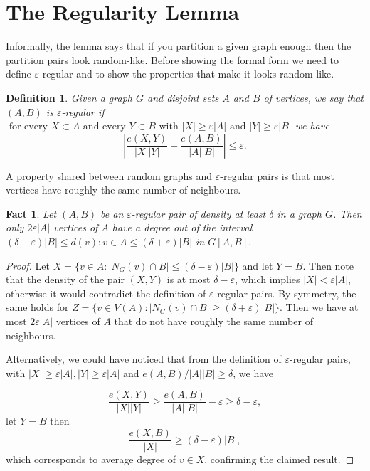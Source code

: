 \documentclass[12pt,twoside,a4paper,bibliography=totocnumbered]{book}
\numberwithin{equation}{section}
\newtheorem{definition}	[theorem] {Definition}
\newtheorem{fact}	[theorem] {Fact}
\theoremstyle{remark}
\begin{document}
\section{The Regularity Lemma}

Informally, the lemma says that if you partition a given graph enough then the partition pairs look random-like. Before showing the formal form we need to define $\varepsilon$-regular and to show the properties that make it looks random-like.

\begin{definition}
Given a graph $G$ and disjoint sets $A$ and $B$ of vertices, we say that $(A,B)$ is $\varepsilon$-regular if $\text{ for every } X \subset A \text{ and every } Y \subset B\text{ with } |X| \geq \varepsilon|A| \text{ and } |Y| \geq \varepsilon |B|$ we have
$$ \left| \frac{e(X,Y)}{|X||Y|} - \frac{e(A,B)}{|A||B|} \right| \leq \varepsilon  .$$
\end{definition}


A property shared between random graphs and $\varepsilon$-regular pairs is that most vertices have roughly the same number of neighbours.

\begin{fact}\label{fact:503}
Let $(A,B)$ be an $\varepsilon$-regular pair of density at least $\delta$ in a graph $G$. Then only $2 \varepsilon |A| $ vertices of $A$ have a degree out of the interval $(\delta - \varepsilon)|B| \leq d(v): v \in A \leq (\delta + \varepsilon)|B|$ in $G[A,B].$
\end{fact}
\begin{proof}
Let $X = \{v \in A \colon | N_G(v) \cap B | \leq (\delta-\varepsilon)|B|\}$ and let $Y=B$. Then note that the density of the pair $(X,Y)$ is at most  $\delta - \varepsilon$, which implies $|X| < \varepsilon |A|$, otherwise it would contradict the definition of $\varepsilon$-regular pairs. By symmetry, the same holds for $Z = \{ v \in V(A) \colon |N_G(v) \cap B| \geq (\delta+\varepsilon)|B|\}$. Then we have at most $2 \varepsilon |A| $ vertices of $A$ that do not have roughly the same number of neighbours.

Alternatively, we could have noticed that from the definition of $\varepsilon$-regular pairs, with $|X| \geq \varepsilon|A|, |Y|\geq \varepsilon|A|$ and $e(A,B)/|A||B| \geq \delta $, we have

$$ \frac{e(X,Y)}{|X||Y|} \geq \frac{e(A,B)}{|A||B|} - \varepsilon \geq \delta - \varepsilon,$$
let $Y = B$ then
$$ \frac{e(X,B)}{|X|} \geq (\delta - \varepsilon)|B|,$$
which corresponds to average degree of $v \in X$, confirming the claimed result.
\end{proof}
\end{document}
